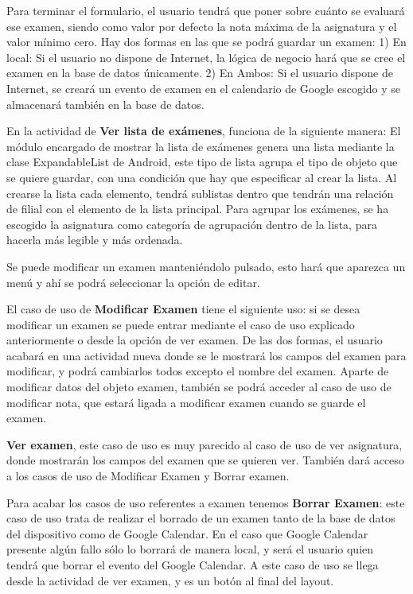 Para terminar el formulario, el usuario tendrá que poner sobre cuánto se evaluará ese examen, siendo como valor por defecto la nota máxima de la asignatura y el valor mínimo cero.
Hay dos formas en las que se podrá guardar un examen:
1) En local: Si el usuario no dispone de Internet, la lógica de negocio hará que se cree el examen en la base de datos únicamente.
2) En Ambos: Si el usuario dispone de Internet, se creará un evento de examen en el calendario de Google escogido  y se almacenará también en la base de datos.

En la actividad de \textbf{Ver lista de exámenes}, funciona de la siguiente manera: El módulo encargado de mostrar la lista de exámenes genera una lista mediante la clase ExpandableList de Android, este tipo de lista agrupa el tipo de objeto que se quiere guardar, con una condición que hay que especificar al crear la lista. Al crearse la lista cada elemento, tendrá  sublistas dentro que tendrán una relación de filial con el elemento de la lista principal. Para agrupar los exámenes, se ha escogido la asignatura como categoría de agrupación dentro de la lista, para hacerla más legible y más ordenada.

Se puede modificar un examen manteniéndolo pulsado, esto hará que aparezca un menú y ahí se podrá seleccionar la opción de editar.

El caso de uso de \textbf{Modificar Examen} tiene el siguiente uso: si se desea modificar un examen se puede entrar mediante el caso de uso explicado anteriormente o desde la opción de ver examen. De las dos formas, el usuario acabará en una actividad nueva donde se le mostrará los campos del examen para modificar, y podrá cambiarlos todos excepto el nombre del examen.
Aparte de modificar datos del objeto examen, también se podrá acceder al caso de uso de modificar nota, que estará ligada a modificar examen cuando se guarde el examen.

\textbf{Ver examen}, este caso de uso es muy parecido al caso de uso de ver asignatura, donde mostrarán los campos del examen que se quieren ver. También dará acceso a los casos de uso de Modificar Examen y Borrar examen.

Para acabar los casos de uso referentes a examen tenemos \textbf{Borrar Examen}: este caso de uso trata de realizar el borrado de un examen tanto de la base de datos del dispositivo como de Google Calendar. En el caso que Google Calendar presente algún fallo sólo lo borrará de manera local, y será el usuario quien tendrá que borrar el evento del Google Calendar.
A este caso de uso se llega desde la actividad de ver examen, y es un botón al final del layout.

